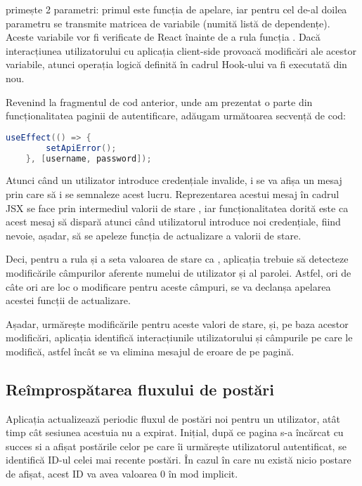  primește 2 parametri: primul este funcția de apelare, iar pentru cel de-al doilea parametru se transmite matricea de variabile (numită listă de dependențe). Aceste variabile vor fi verificate de React înainte de a rula funcția . Dacă interacțiunea utilizatorului cu aplicația client-side provoacă modificări ale acestor variabile, atunci operația logică definită în cadrul Hook-ului  va fi executată din nou.\newline

Revenind la fragmentul de cod anterior, unde am prezentat o parte din funcționalitatea paginii de autentificare, adăugam următoarea secvență de cod:\newline

\begin{lstlisting}[language=Java]
	  useEffect(() => {
		setApiError();
	}, [username, password]);
\end{lstlisting}
\bigskip

Atunci când un utilizator introduce credențiale invalide, i se va afișa un mesaj prin care să i se semnaleze acest lucru. Reprezentarea acestui mesaj în cadrul JSX se face prin intermediul valorii de stare , iar funcționalitatea dorită este ca acest mesaj să dispară atunci când utilizatorul introduce noi credențiale, fiind nevoie, așadar, să se apeleze funcția de actualizare a valorii de stare.\newline

Deci, pentru a rula  și a seta valoarea de stare  ca , aplicația trebuie să detecteze modificările câmpurilor aferente numelui de utilizator și al parolei. Astfel, ori de câte ori are loc o modificare pentru aceste câmpuri, se va declanșa apelarea acestei funcții de actualizare.\newline

Așadar,  urmărește modificările pentru aceste valori de stare, și, pe baza acestor modificări, aplicația identifică interacțiunile utilizatorului și câmpurile pe care le modifică, astfel încât se va elimina mesajul de eroare de pe pagină.\newline

\subsection{Reîmprospătarea fluxului de postări}

Aplicația actualizează periodic fluxul de postări noi pentru un utilizator, atât timp cât sesiunea acestuia nu a expirat. Inițial, după ce pagina s-a încărcat cu succes si a afișat postările celor pe care îi urmărește utilizatorul autentificat, se identifică ID-ul celei mai recente postări. În cazul în care nu există nicio postare de afișat, acest ID va avea valoarea 0 în mod implicit.\newline

